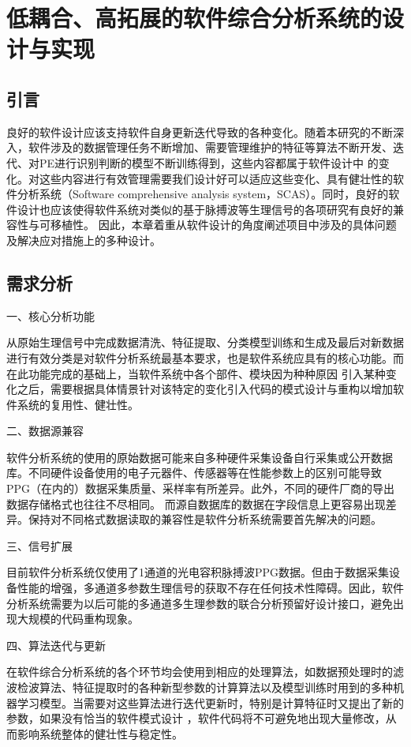 \chapter{低耦合、高拓展的软件综合分析系统的设计与实现}
\section{引言}
良好的软件设计应该支持软件自身更新迭代导致的各种变化\cite{Enrich2018}。随着本研究的不断深入，软件涉及的数据管理任务不断增加、需要管理维护的特征等算法不断开发、迭代、对PE进行识别判断的模型不断训练得到，这些内容都属于软件设计中
的变化。对这些内容进行有效管理需要我们设计好可以适应这些变化、具有健壮性的软件分析系统（Software comprehensive analysis system，SCAS）。同时，良好的软件设计也应该使得软件系统对类似的基于脉搏波等生理信号的各项研究有良好的兼容性与可移植性。
因此，本章着重从软件设计的角度阐述项目中涉及的具体问题及解决应对措施上的多种设计。

\section{需求分析}
一、核心分析功能

从原始生理信号中完成数据清洗、特征提取、分类模型训练和生成及最后对新数据进行有效分类是对软件分析系统最基本要求，也是软件系统应具有的核心功能。而在此功能完成的基础上，当软件系统中各个部件、模块因为种种原因
引入某种变化之后，需要根据具体情景针对该特定的变化引入代码的模式设计与重构以增加软件系统的复用性、健壮性。

二、数据源兼容

软件分析系统的使用的原始数据可能来自多种硬件采集设备自行采集或公开数据库。不同硬件设备使用的电子元器件、传感器等在性能参数上的区别可能导致PPG（在内的）数据采集质量、采样率有所差异。此外，不同的硬件厂商的导出数据存储格式也往往不尽相同。
而源自数据库的数据在字段信息上更容易出现差异。保持对不同格式数据读取的兼容性是软件分析系统需要首先解决的问题。

三、信号扩展

目前软件分析系统仅使用了1通道的光电容积脉搏波PPG数据。但由于数据采集设备性能的增强，多通道多参数生理信号的获取不存在任何技术性障碍。因此，软件分析系统需要为以后可能的多通道多生理参数的联合分析预留好设计接口，避免出现大规模的代码重构现象。

四、算法迭代与更新

在软件综合分析系统的各个环节均会使用到相应的处理算法，如数据预处理时的滤波检波算法、特征提取时的各种新型参数的计算算法以及模型训练时用到的多种机器学习模型。当需要对这些算法进行迭代更新时，特别是计算特征时又提出了新的参数，如果没有恰当的软件模式设计
，软件代码将不可避免地出现大量修改，从而影响系统整体的健壮性与稳定性。

